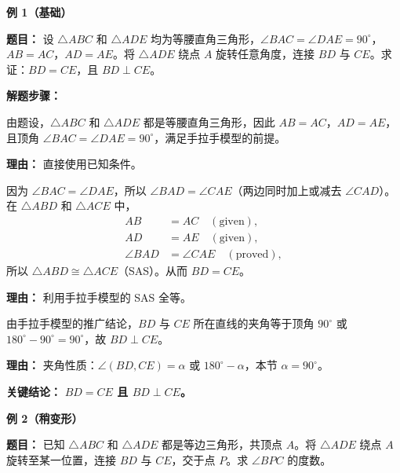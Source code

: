\begin{examplebox}
	\textbf{\textcolor{CExample}{例 1（基础）}}

	\textbf{\textcolor{CExample}{题目：}}
	设 $\triangle ABC$ 和 $\triangle ADE$ 均为等腰直角三角形，$\angle BAC = \angle DAE = 90^\circ$，$AB = AC$，$AD = AE$。将 $\triangle ADE$ 绕点 $A$ 旋转任意角度，连接 $BD$ 与 $CE$。求证：$BD = CE$，且 $BD \perp CE$。

	\textbf{\textcolor{CExample}{解题步骤：}}
	\begin{description}[style=nextline, leftmargin=2.8em, labelsep=0.5em, itemsep=0.45em]
		\item[\textbf{第一步（条件识别）：}]
			由题设，$\triangle ABC$ 和 $\triangle ADE$ 都是等腰直角三角形，因此 $AB = AC$，$AD = AE$，且顶角 $\angle BAC = \angle DAE = 90^\circ$，满足手拉手模型的前提。
			\par\textbf{理由：}
			直接使用已知条件。

		\item[\textbf{第二步（全等证明）：}]
			因为 $\angle BAC = \angle DAE$，所以 $\angle BAD = \angle CAE$（两边同时加上或减去 $\angle CAD$）。在 $\triangle ABD$ 和 $\triangle ACE$ 中，
			\[
				\begin{aligned}
					AB &= AC \quad (\text{given}),\\
					AD &= AE \quad (\text{given}),\\
					\angle BAD &= \angle CAE \quad (\text{proved}),
			\end{aligned}
			\]
			所以 $\triangle ABD \cong \triangle ACE$（SAS）。从而 $BD = CE$。
			\par\textbf{理由：}
			利用手拉手模型的 SAS 全等。

		\item[\textbf{第三步（垂直推得）：}]
			由手拉手模型的推广结论，$BD$ 与 $CE$ 所在直线的夹角等于顶角 $90^\circ$ 或 $180^\circ-90^\circ=90^\circ$，故 $BD \perp CE$。
			\par\textbf{理由：}
			夹角性质：$\angle(BD, CE) = \alpha$ 或 $180^\circ-\alpha$，本节 $\alpha=90^\circ$。
	\end{description}

	\textbf{\textcolor{CExample}{关键结论：}}
	\textbf{$BD = CE$ 且 $BD \perp CE$。}

	\medskip
	\textbf{\textcolor{CExample}{例 2（稍变形）}}

	\textbf{\textcolor{CExample}{题目：}}
	已知 $\triangle ABC$ 和 $\triangle ADE$ 都是等边三角形，共顶点 $A$。将 $\triangle ADE$ 绕点 $A$ 旋转至某一位置，连接 $BD$ 与 $CE$，交于点 $P$。求 $\angle BPC$ 的度数。


\end{examplebox}
